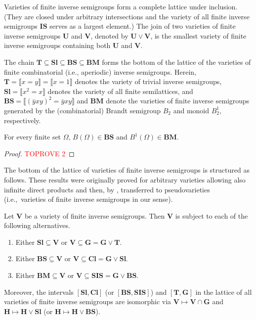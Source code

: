 \documentclass[anonymous,letter,UKenglish,cleveref,autoref,thm-restate]{lipics-v2021}
\newcommand{\ie}{i.e.,~}
\newcommand{\sse}{\subseteq}
\newcommand{\vU}{\ensuremath{\mathbf{U}}}
\newcommand{\vV}{\ensuremath{\mathbf{V}}}
\newcommand{\vT}{\ensuremath{\mathbf{T}}}
\newcommand{\vH}{\ensuremath{\mathbf{H}}}
\newcommand{\vG}{\ensuremath{\mathbf{G}}}
\newcommand{\vSl}{\ensuremath{\mathbf{Sl}}}
\newcommand{\vCl}{\ensuremath{\mathbf{Cl}}}
\newcommand{\vSI}{\ensuremath{\mathbf{SIS}}}
\newcommand{\vBS}{\ensuremath{\mathbf{BS}}}  \newcommand{\vBM}{\ensuremath{\mathbf{BM}}}
\newcommand{\vId}[1]{\ensuremath{\llbracket #1 \rrbracket}}
\theoremstyle{plain}
\theoremstyle{plain}
\begin{document}
Varieties of finite inverse semigroups form a complete lattice under inclusion. (They are closed under arbitrary intersections and the variety of all finite inverse semigroups $\mathbf{IS}$ serves as a largest element.)
The join of two varieties of finite inverse semigroups $\vU$ and $\vV$, denoted by $\vU \vee \vV$, is the smallest variety of finite inverse semigroups containing both $\vU$ and $\vV$.

The chain $\vT \sse \vSl \sse \vBS \sse \vBM$ forms the bottom of the lattice of the varieties of finite combinatorial (i.e., aperiodic) inverse semigroups.
Herein, $\vT = \vId{x=y} = \vId{x=1}$ denotes the variety of trivial inverse semigroups, $\vSl = \vId{x^2 = x}$ denotes the variety of all finite semilattices, and $\vBS = \vId{(\bar y x y)^2 = \bar y x y}$ and $\vBM$ denote the varieties of finite inverse semigroups generated by the (combinatorial) Brandt semigroup $B_2$ and monoid $B_2^1$, respectively.

\begin{lemma}\label{lem:b2_implies_bn}
	For every finite set $\Omega$, $B(\Omega) \in \vBS$ and $B^1(\Omega) \in \vBM$.
\end{lemma}
\begin{proof}\textcolor{red}{TOPROVE 2}\end{proof}

The bottom of the lattice of varieties of finite inverse semigroups is structured as follows. 
These results were originally proved for arbitrary varieties allowing also infinite direct products and then, by \cite{HallJohnston89}, transferred to pseudovarieties (\ie varieties  of finite inverse semigroups in our sense).

\begin{proposition}\label{pro:varieties}
  Let $\vV$ be a variety of finite inverse semigroups.
  Then $\vV$ is subject to each of the following alternatives.
  \begin{enumerate}
    \item Either $\vSl \sse \vV$ or $\vV \sse \vG = \vG \vee \vT$.
    \item Either $\vBS \sse \vV$ or $\vV \sse \vCl = \vG \vee \vSl$.
    \item Either $\vBM \sse \vV$ or $\vV \sse \vSI = \vG \vee \vBS$.
  \end{enumerate}\smallskip
  \hspace{\parindent}Moreover, the intervals $[\vSl, \vCl]$ (or $[\vBS, \vSI]$) and $[\vT, \vG]$ in the lattice of all varieties of finite inverse semigroups are isomorphic via $\vV \mapsto \vV \cap \vG$ and $\vH \mapsto \vH \vee \vSl$ (or $\vH \mapsto \vH \vee \vBS$).
\end{proposition}
\end{document}
